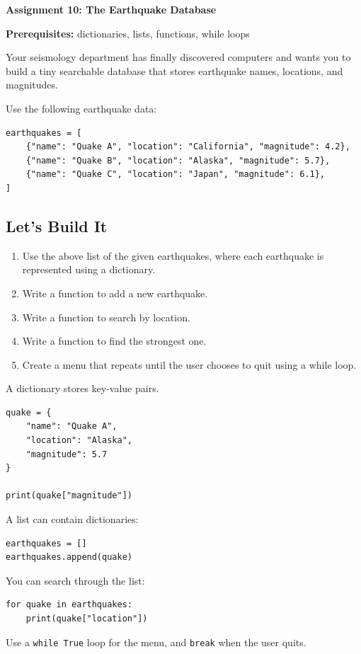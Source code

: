 \documentclass[11pt,letterpaper]{article}
\newcommand{\assignment}[3]{
    \clearpage
    {\Large\bfseries\color{navy} Assignment #1: #2}

    \vspace{2mm}
    {\small\color{darkgray}\textbf{Prerequisites:} #3}

    \vspace{3mm}
}
\newcommand{\steps}{\subsection*{Let's Build It}}
\begin{document}
\assignment{10}{The Earthquake Database}
{dictionaries, lists, functions, while loops}

\begin{missionbox}
Your seismology department has finally discovered computers and wants you to build a tiny searchable database that stores earthquake names, locations, and magnitudes.
\end{missionbox}

Use the following earthquake data:

\begin{lstlisting}
earthquakes = [
    {"name": "Quake A", "location": "California", "magnitude": 4.2},
    {"name": "Quake B", "location": "Alaska", "magnitude": 5.7},
    {"name": "Quake C", "location": "Japan", "magnitude": 6.1},
]
\end{lstlisting}

\steps

\begin{enumerate}
    \item Use the above list of the given earthquakes, where each earthquake is represented using a dictionary.
    \item Write a function to add a new earthquake.
    \item Write a function to search by location.
    \item Write a function to find the strongest one.
    \item Create a menu that repeats until the user chooses to quit using a while loop.
\end{enumerate}

\begin{hintbox}
A dictionary stores key-value pairs.

\begin{lstlisting}
quake = {
    "name": "Quake A",
    "location": "Alaska",
    "magnitude": 5.7
}

print(quake["magnitude"])
\end{lstlisting}

A list can contain dictionaries:

\begin{lstlisting}
earthquakes = []
earthquakes.append(quake)
\end{lstlisting}

You can search through the list:

\begin{lstlisting}
for quake in earthquakes:
    print(quake["location"])
\end{lstlisting}

Use a \texttt{while True} loop for the menu,
and \texttt{break} when the user quits.
\end{hintbox}
\end{document}
